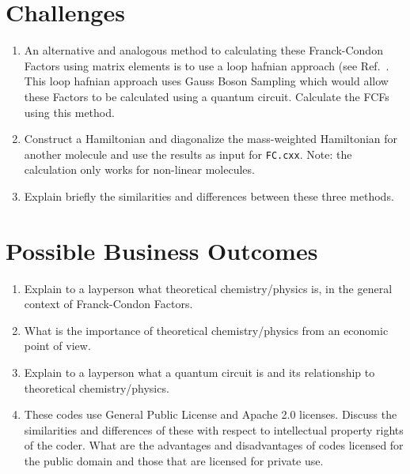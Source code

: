 \documentclass[12pt]{article}
\begin{document}
\section*{Challenges}

\begin{enumerate}
    \item An alternative and analogous method to calculating these Franck-Condon Factors using matrix elements is to use a loop hafnian approach (see Ref.~\cite{quesadaFranckCondonFactorsCounting2019}. This loop hafnian approach uses Gauss Boson Sampling which would allow these Factors to be calculated using a quantum circuit. Calculate the FCFs using this method.
    \item Construct a Hamiltonian and diagonalize the mass-weighted Hamiltonian for another molecule and use the results as input for \texttt{FC.cxx}. Note: the calculation only works for non-linear molecules.
    \item Explain briefly the similarities and differences between these three methods.
\end{enumerate}

\section*{Possible Business Outcomes}

\begin{enumerate}
    \item Explain to a layperson what theoretical chemistry/physics is, in the general context of Franck-Condon Factors.
    \item What is the importance of theoretical chemistry/physics from an economic point of view.
    \item Explain to a layperson what a quantum circuit is and its relationship to theoretical chemistry/physics.
    \item These codes use General Public License and Apache 2.0 licenses. Discuss the similarities and differences of these with respect to intellectual property rights of the coder. What are the advantages and disadvantages of codes licensed for the public domain and those that are licensed for private use.
\end{enumerate}

\newpage



\end{document}

